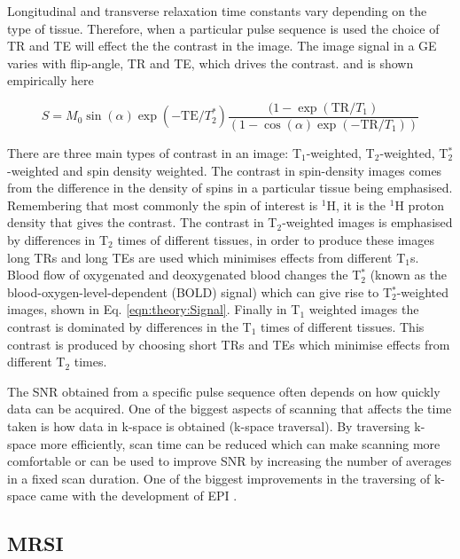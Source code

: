Longitudinal and transverse relaxation time constants vary depending on the type of tissue. Therefore, when a particular pulse sequence is used the choice of \ac{TR} and \ac{TE} will effect the the contrast in the image. The image signal in a \ac{GE} varies with flip-angle, \ac{TR} and \ac{TE}, which drives the contrast. and is shown empirically here

\begin{equation}
    S = M_0\sin(\alpha)\exp(-\textrm{TE}/T_2^*)\frac{(1-\exp(\textrm{TR}/T_1)}{(1-\cos(\alpha)\exp(-\textrm{TR}/T_1))}
    \label{eqn:theory:Signal}
\end{equation}

\noindent There are three main types of contrast in an image: T$_1$-weighted, T$_2$-weighted, T$_2^*$-weighted and spin density weighted. The contrast in spin-density images comes from the difference in the density of spins in a particular tissue being emphasised. Remembering that most commonly the spin of interest is $^1$H, it is the $^1$H proton density that gives the contrast. The contrast in T$_2$-weighted images is emphasised by differences in T$_2$ times of different tissues, in order to produce these images long \ac{TR}s and long \ac{TE}s are used which minimises effects from different T$_1$s. Blood flow of oxygenated and deoxygenated blood changes the T$_2^*$ (known as the blood-oxygen-level-dependent (BOLD) signal) which can give rise to T$_2^*$-weighted images, shown in Eq. \ref{eqn:theory:Signal}. Finally in T$_1$ weighted images the contrast is dominated by differences in the T$_1$ times of different tissues. This contrast is produced by choosing short \ac{TR}s and \ac{TE}s which minimise effects from different T$_2$ times. 

The \ac{SNR} obtained from a specific pulse sequence often depends on how quickly data can be acquired. One of the biggest aspects of scanning that affects the time taken is how data in k-space is obtained (k-space traversal). By traversing k-space more efficiently, scan time can be reduced which can make scanning more comfortable or can be used to improve \ac{SNR} by increasing the number of averages in a fixed scan duration. One of the biggest improvements in the traversing of k-space came with the development of \ac{EPI} \cite{Stehling1991Echo-planarSecond}.

\subsection{MRSI}

